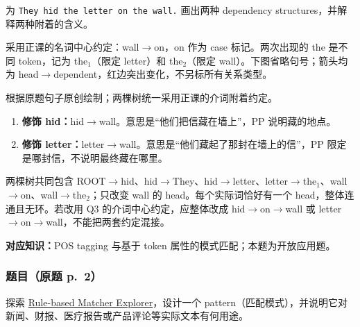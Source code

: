 为 \texttt{They hid the letter on the wall.} 画出两种 dependency structures，并解释两种附着的含义。

\begin{checkedsolution}
采用正课的名词中心约定：wall$\rightarrow$on，on 作为 case 标记。两次出现的 the 是不同 token，记为 the$_1$（限定 letter）和 the$_2$（限定 wall）。下图省略句号；箭头均为 head$\rightarrow$dependent，红边突出变化，不另标所有关系类型。

\begin{center}


{\small 根据原题句子原创绘制；两棵树统一采用正课的介词附着约定。}
\end{center}

\begin{enumerate}
  \item \textbf{修饰 hid：}hid$\rightarrow$wall。意思是“他们把信藏在墙上”，PP 说明藏的地点。
  \item \textbf{修饰 letter：}letter$\rightarrow$wall。意思是“他们藏起了那封在墙上的信”，PP 限定是哪封信，不说明最终藏在哪里。
\end{enumerate}
两棵树共同包含 ROOT$\rightarrow$hid、hid$\rightarrow$They、hid$\rightarrow$letter、letter$\rightarrow$the$_1$、wall$\rightarrow$on、wall$\rightarrow$the$_2$；只改变 wall 的 head。每个实际词恰好有一个 head，整体连通且无环。若改用 Q3 的介词中心约定，应整体改成 hid$\rightarrow$on$\rightarrow$wall 或 letter$\rightarrow$on$\rightarrow$wall，不能把两套约定混接。
\end{checkedsolution}


\textbf{对应知识：}POS tagging 与基于 token 属性的模式匹配；本题为开放应用题。

\subsubsection*{题目（原题 p.~2）}

探索 \href{https://demos.explosion.ai/matcher}{Rule-based Matcher Explorer}，设计一个 pattern（匹配模式），并说明它对新闻、财报、医疗报告或产品评论等实际文本有何用途。

